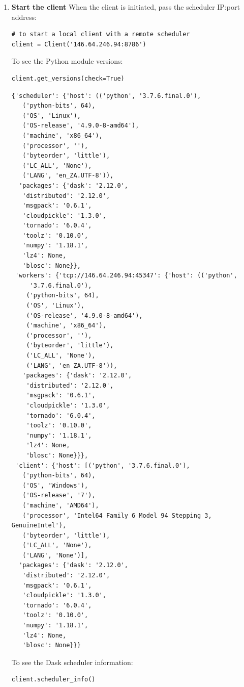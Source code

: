 \begin{enumerate}
\item \textbf{Start the client}  When the client is initiated, pass the scheduler IP:port address:

\begin{lstlisting}[style=tinysize]
# to start a local client with a remote scheduler
client = Client('146.64.246.94:8786') 
\end{lstlisting}

To see the Python module versions:
\begin{lstlisting}[style=tinysize]
client.get_versions(check=True)
\end{lstlisting}

\begin{lstlisting}[style=outcellstyle]
{'scheduler': {'host': (('python', '3.7.6.final.0'),
   ('python-bits', 64),
   ('OS', 'Linux'),
   ('OS-release', '4.9.0-8-amd64'),
   ('machine', 'x86_64'),
   ('processor', ''),
   ('byteorder', 'little'),
   ('LC_ALL', 'None'),
   ('LANG', 'en_ZA.UTF-8')),
  'packages': {'dask': '2.12.0',
   'distributed': '2.12.0',
   'msgpack': '0.6.1',
   'cloudpickle': '1.3.0',
   'tornado': '6.0.4',
   'toolz': '0.10.0',
   'numpy': '1.18.1',
   'lz4': None,
   'blosc': None}},
 'workers': {'tcp://146.64.246.94:45347': {'host': (('python',
     '3.7.6.final.0'),
    ('python-bits', 64),
    ('OS', 'Linux'),
    ('OS-release', '4.9.0-8-amd64'),
    ('machine', 'x86_64'),
    ('processor', ''),
    ('byteorder', 'little'),
    ('LC_ALL', 'None'),
    ('LANG', 'en_ZA.UTF-8')),
   'packages': {'dask': '2.12.0',
    'distributed': '2.12.0',
    'msgpack': '0.6.1',
    'cloudpickle': '1.3.0',
    'tornado': '6.0.4',
    'toolz': '0.10.0',
    'numpy': '1.18.1',
    'lz4': None,
    'blosc': None}}},
 'client': {'host': [('python', '3.7.6.final.0'),
   ('python-bits', 64),
   ('OS', 'Windows'),
   ('OS-release', '7'),
   ('machine', 'AMD64'),
   ('processor', 'Intel64 Family 6 Model 94 Stepping 3, GenuineIntel'),
   ('byteorder', 'little'),
   ('LC_ALL', 'None'),
   ('LANG', 'None')],
  'packages': {'dask': '2.12.0',
   'distributed': '2.12.0',
   'msgpack': '0.6.1',
   'cloudpickle': '1.3.0',
   'tornado': '6.0.4',
   'toolz': '0.10.0',
   'numpy': '1.18.1',
   'lz4': None,
   'blosc': None}}}
\end{lstlisting}



To see the Dask scheduler information:
\begin{lstlisting}[style=tinysize]
client.scheduler_info()
\end{lstlisting}


\end{enumerate}
